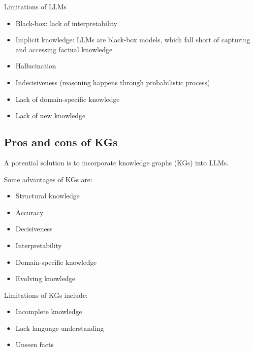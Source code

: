 \documentclass[11pt, reqno]{amsart}
\theoremstyle{definition}
\theoremstyle{remark}
\begin{document}
  Limitations of LLMs

  \begin{itemize}
    \item Black-box: lack of interpretability

    \item Implicit knowledge: LLMs are black-box models, which fall short of capturing
      and accessing factual knowledge

    \item Hallucination

    \item Indecisiveness (reasoning happens through probabilistic process)

    \item Lack of domain-specific knowledge

    \item Lack of new knowledge
  \end{itemize}

  \subsection{Pros and cons of KGs}

  A potential solution is to incorporate knowledge graphs (KGs) into LLMs.

  Some advantages of KGs are:

  \begin{itemize}
    \item Structural knowledge

    \item Accuracy

    \item Decisiveness

    \item Interpretability

    \item Domain-specific knowledge

    \item Evolving knowledge
  \end{itemize}

  Limitations of KGs include:

  \begin{itemize}
    \item Incomplete knowledge

    \item Lack language understanding

    \item Unseen facts
  \end{itemize}
\end{document}
